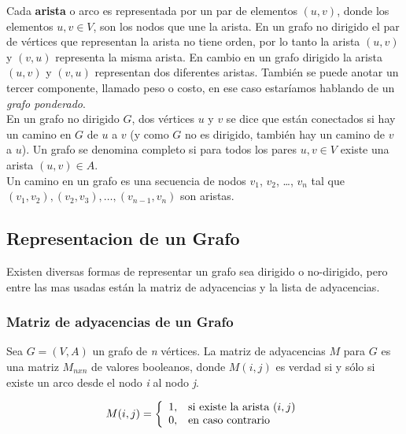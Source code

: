       Cada \textbf{arista} o arco es representada por un par de elementos $(u,v)$, donde los elementos $u,v \in V$, son los nodos que une la arista.
      En un grafo no dirigido el par de vértices que representan la arista no tiene orden, por lo tanto la arista $(u,v)$ y $(v,u)$ representa la misma arista. En cambio en un grafo dirigido la arista $(u,v)$ y $(v,u)$ representan dos diferentes aristas. También se puede anotar un tercer componente, llamado peso o costo, en ese caso estaríamos hablando de un \emph{grafo ponderado}.\\

      En un grafo no dirigido $G$, dos vértices $u$ y $v$ se dice que están conectados si hay un camino en $G$ de $u$ a $v$ (y como $G$ no es dirigido, también hay un camino de $v$ a $u$). Un grafo  se denomina completo si para todos los pares $u,v \in V$ existe una arista $(u,v) \in A$.\\

      Un camino en un grafo es una secuencia de nodos $v_{1}$, $v_{2}$, \ldots{}, $v_n$ tal que $(v_{1}, v_{2}), (v_{2}, v_{3}), \ldots{}, (v_{n-1}, v_n)$ son aristas. 
    \subsection{Representacion de un Grafo} %
    \label{sub:representacion_de_un_grafo}
      Existen diversas formas de representar un grafo sea dirigido o no-dirigido, pero entre las mas usadas están la matriz de adyacencias y la lista de adyacencias.
      \subsubsection{Matriz de adyacencias de un Grafo} %
      \label{ssub:matriz_de_adyacencias_de_un_grafo}  
        Sea $G = (V,A)$ un grafo de \emph{n} vértices. La matriz de adyacencias $M$  para $G$ es una matriz $M_{nxn}$ de valores booleanos, donde $M(i,j)$ es verdad si y sólo si existe un arco desde el nodo \emph{i} al nodo \emph{j}.

        \begin{displaymath}
          M(i,j) = \left\{ 
          \begin{array}{ l l }
            1, & \textrm{si existe la arista } (i,j) \\
            0, & \textrm{en caso contrario}
          \end{array} \right.
        \end{displaymath}



